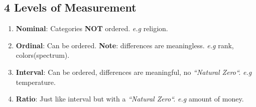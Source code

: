 \documentclass{article}
\begin{document}
\subsection{4 Levels of Measurement}
\begin{enumerate}
	\item \textbf{Nominal}: Categories \textbf{NOT} ordered. \textit{e.g} religion.
	\item \textbf{Ordinal}: Can be ordered. \textbf{Note}: differences are meaningless. \textit{e.g} rank, colors(spectrum).
	\item \textbf{Interval}: Can be ordered, differences are meaningful, no \textit{``Natural Zero``.} \textit{e.g} temperature.
	\item \textbf{Ratio}: Just like interval but with a \textit{``Natural Zero``.} \textit{e.g} amount of money.
\end{enumerate}
\end{document}
